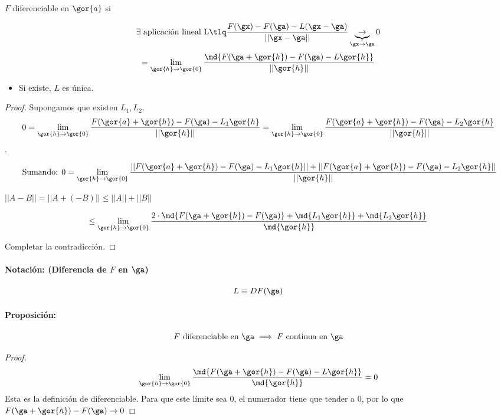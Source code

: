\documentclass{apuntes}
\begin{document}
\begin{defn}
 $F$ diferenciable en $\gor{a}$ si 
 
 $$\exists \text{ aplicación lineal L} \tlq \frac{F(\gx)-F(\ga)-L(\gx-\ga)}{||\gx-\ga||} \underbrace{\rightarrow}_{\gx\rightarrow\ga} 0$$
$$ = \lim_{\gor{h} \rightarrow \gor{0}} \frac{\md{F(\ga+\gor{h}) - F(\ga) - L\gor{h}}}{||\gor{h}||}$$

\end{defn}


\obs
\begin{itemize}
\item Si existe, $L$ es única.
\end{itemize}

\begin{proof}
Supongamos que existen $L_1,L_2$.
\[0=\lim_{\gor{h} \rightarrow \gor{0}} \frac{F(\gor{a}+\gor{h}) - F(\ga)-L_1\gor{h}}{||\gor{h}||} = \lim_{\gor{h} \rightarrow \gor{0}} \frac{F(\gor{a}+\gor{h}) - F(\ga)-L_2\gor{h}}{||\gor{h}||}\].

$$\text{ Sumando: } 0 = \lim_{\gor{h} \rightarrow \gor{0}} \frac{||F(\gor{a}+\gor{h}) - F(\ga)-L_1\gor{h}|| + ||F(\gor{a}+\gor{h}) - F(\ga) -L_2\gor{h}||}{||\gor{h}||}$$

\obs $||A-B|| = ||A+(-B)|| \leq ||A||+||B||$

$$\leq \lim_{\gor{h} \rightarrow \gor{0}} \frac{2\cdot\md{F(\ga + \gor{h}) - F(\ga)} + \md{L_1\gor{h}} + \md{L_2\gor{h}}}{\md{\gor{h}}}$$

Completar la contradicción.
\end{proof}

\paragraph{Notación: (Diferencia de $F$ en $\ga$)}

$$L\equiv DF(\ga)$$ 

\paragraph{Proposición:}
$$F \text{ diferenciable en } \ga \implies F \text{ continua en } \ga$$
\begin{proof}
 $$\lim_{\gor{h} \rightarrow \gor{0}} \frac{\md{F(\ga+\gor{h}) - F(\ga) - L\gor{h}}}{\md{\gor{h}}} = 0$$
 Esta es la definición de diferenciable. Para que este límite sea 0, el numerador tiene que tender a 0, por lo que $F(\ga+\gor{h}) - F(\ga) \rightarrow 0$
\end{proof}
\end{document}
